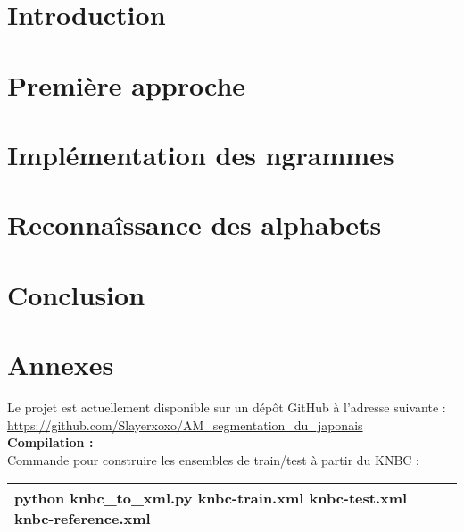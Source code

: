 \documentclass[a4paper]{article}
\begin{document}
	


	\tableofcontents
	\newpage
	

	\section*{Introduction}
	


	\section{Première approche}
	
	
	
	\section{Implémentation des ngrammes}
	
	

	\section{Reconnaîssance des alphabets}
	

	
	\section*{Conclusion}
	
	\newpage
	
	\section*{Annexes}
	
	Le projet est actuellement disponible sur un dépôt GitHub à l'adresse suivante : \url{https://github.com/Slayerxoxo/AM_segmentation_du_japonais}\\
	
	\textbf{Compilation : }\\
  	Commande pour construire les ensembles de train/test à partir du KNBC :
  	\begin{tabular}{|l|}
  		\hline
		python knbc\_to\_xml.py knbc-train.xml knbc-test.xml knbc-reference.xml \\
		\hline
	\end{tabular}
	\vspace{0.5cm}
	
\end{document}
